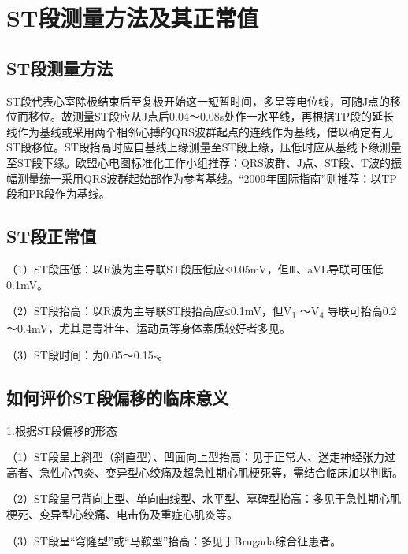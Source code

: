 \protect\hypertarget{text00011.htmlux5cux23subid73}{}{}

\section{ST段测量方法及其正常值}

\protect\hypertarget{text00011.htmlux5cux23subid74}{}{}

\subsection{ST段测量方法}

ST段代表心室除极结束后至复极开始这一短暂时间，多呈等电位线，可随J点的移位而移位。故测量ST段应从J点后0.04～0.08s处作一水平线，再根据TP段的延长线作为基线或采用两个相邻心搏的QRS波群起点的连线作为基线，借以确定有无ST段移位。ST段抬高时应自基线上缘测量至ST段上缘，压低时应从基线下缘测量至ST段下缘。欧盟心电图标准化工作小组推荐：QRS波群、J点、ST段、T波的振幅测量统一采用QRS波群起始部作为参考基线。“2009年国际指南”则推荐：以TP段和PR段作为基线。

\protect\hypertarget{text00011.htmlux5cux23subid75}{}{}

\subsection{ST段正常值}

（1）ST段压低：以R波为主导联ST段压低应≤0.05mV，但Ⅲ、aVL导联可压低0.1mV。

（2）ST段抬高：以R波为主导联ST段抬高应≤0.1mV，但V\textsubscript{1}
～V\textsubscript{4}
导联可抬高0.2～0.4mV，尤其是青壮年、运动员等身体素质较好者多见。

（3）ST段时间：为0.05～0.15s。

\protect\hypertarget{text00011.htmlux5cux23subid76}{}{}

\subsection{如何评价ST段偏移的临床意义}

1.根据ST段偏移的形态

（1）ST段呈上斜型（斜直型）、凹面向上型抬高：见于正常人、迷走神经张力过高者、急性心包炎、变异型心绞痛及超急性期心肌梗死等，需结合临床加以判断。

（2）ST段呈弓背向上型、单向曲线型、水平型、墓碑型抬高：多见于急性期心肌梗死、变异型心绞痛、电击伤及重症心肌炎等。

（3）ST段呈“穹隆型”或“马鞍型”抬高：多见于Brugada综合征患者。

